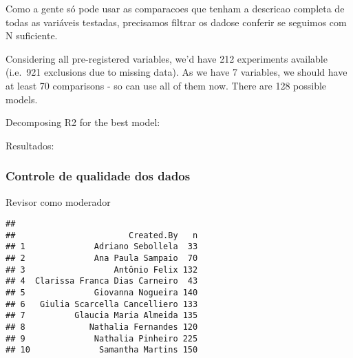 \documentclass[
]{article}
\begin{document}
Como a gente só pode usar as comparacoes que tenham a descricao completa
de todas as variáveis testadas, precisamos filtrar os dadose conferir se
seguimos com N suficiente.

Considering all pre-registered variables, we'd have 212 experiments
available (i.e.~921 exclusions due to missing data). As we have 7
variables, we should have at least 70 comparisons - so can use all of
them now. There are 128 possible models.

Decomposing R2 for the best model:

Resultados:

\hypertarget{controle-de-qualidade-dos-dados}{%
\subsubsection{Controle de qualidade dos
dados}\label{controle-de-qualidade-dos-dados}}

Revisor como moderador

\begin{verbatim}
## 
##                       Created.By   n 
## 1              Adriano Sebollela  33 
## 2              Ana Paula Sampaio  70 
## 3                  Antônio Felix 132 
## 4  Clarissa Franca Dias Carneiro  43 
## 5              Giovanna Nogueira 140 
## 6   Giulia Scarcella Cancelliero 133 
## 7          Glaucia Maria Almeida 135 
## 8             Nathalia Fernandes 120 
## 9              Nathalia Pinheiro 225 
## 10              Samantha Martins 150
\end{verbatim}
\end{document}
